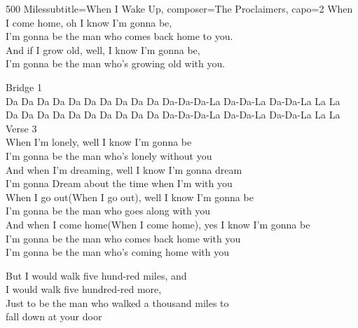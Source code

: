 \begin{song}{500 Miles}{subtitle={When I Wake Up}, composer={The Proclaimers}, capo={2}}
When I come home, oh I know I'm gonna be, \\
I'm gonna be the man who comes back home to you. \\

And if I grow old, well, I know I'm gonna be, \\
I'm gonna be the man who's growing old with you. \\

\begin{songChorus}
\end{songChorus}

Bridge 1 \\
Da Da Da Da          Da Da Da Da      Da Da Da-Da-Da-La Da-Da-La Da-Da-La La La \\

Da Da Da Da           Da Da Da Da      Da Da Da-Da-Da-La Da-Da-La Da-Da-La La La \\

Verse 3 \\
When I'm lonely, well I know I'm gonna be \\
I'm gonna be the man who's lonely without you \\
And when I'm dreaming, well I know I'm gonna dream \\
I'm gonna Dream about the time when I'm with you \\

When I go out(When I go out), well I know I'm gonna be \\
I'm gonna be the man who goes along with you \\
And when I come home(When I come home), yes I know I'm gonna be \\
I'm gonna be the man who comes back home with you \\
I'm gonna be the man who's coming home with you \\

\begin{songChorus}
But I would walk five hund-red miles, and \\
I would walk five hundred-red  more, \\
Just to be the man who walked a thousand  miles to \\
fall down at your door    \\
\end{songChorus}


\end{song}
